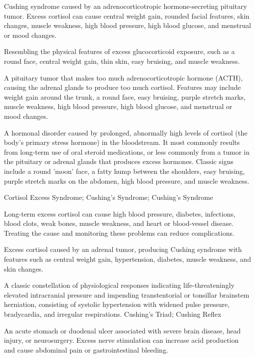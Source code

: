  Cushing syndrome caused by an adrenocorticotropic hormone-secreting pituitary tumor.
Excess cortisol can cause central weight gain, rounded facial features, skin changes, muscle weakness, high blood
pressure, high blood glucose, and menstrual or mood changes.

 Resembling the physical features of excess glucocorticoid exposure, such as a round face, central weight gain, thin skin, easy bruising, and muscle weakness.

 A pituitary tumor that makes too much adrenocorticotropic hormone (ACTH), causing the adrenal glands to produce too much cortisol. Features may include weight gain around the trunk, a round face, easy bruising, purple stretch marks, muscle weakness, high blood pressure, high blood glucose, and menstrual or mood changes.

 A hormonal disorder caused by prolonged, abnormally high levels of cortisol (the body's primary stress hormone) in the bloodstream. It most commonly results from long-term use of oral steroid medications, or less commonly from a tumor in the pituitary or adrenal glands that produces excess hormones. Classic signs include a round 'moon' face, a fatty hump between the shoulders, easy bruising, purple stretch marks on the abdomen, high blood pressure, and muscle weakness.

\synonyms
Cortisol Excess Syndrome; Cushing's Syndrome; Cushing’s Syndrome

 Long-term excess cortisol can cause high blood pressure, diabetes, infections, blood clots, weak bones, muscle weakness, and heart or blood-vessel disease. Treating the cause and monitoring these problems can reduce complications.

 Excess cortisol caused by an adrenal tumor, producing Cushing syndrome with features such as central weight gain, hypertension, diabetes, muscle weakness, and skin changes.

 A classic constellation of physiological responses indicating life-threateningly elevated intracranial pressure and impending transtentorial or tonsillar brainstem herniation, consisting of systolic hypertension with widened pulse pressure, bradycardia, and irregular respirations.
\synonyms
Cushing's Triad; Cushing Reflex

 An acute stomach or duodenal ulcer associated with severe brain disease, head injury, or neurosurgery. Excess nerve stimulation can increase acid production and cause abdominal pain or gastrointestinal bleeding.

